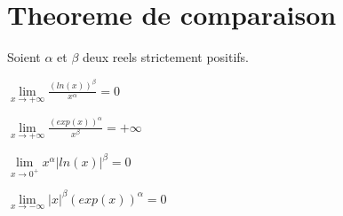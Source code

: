 \documentclass[12pt,twoside,a4paper]{article}
\begin{document}
	\section{Theoreme de comparaison}
		\begin{prop}
			Soient $\alpha$ et $\beta$ deux reels strictement positifs.
			\begin{liste}
				\item $\lim\limits_{x\rightarrow+\infty}\frac{\left(ln(x)\right)^\beta}{x^\alpha}=0$
				\item $\lim\limits_{x\rightarrow+\infty}\frac{\left(exp(x)\right)^\alpha}{x^\beta}=+\infty$
				\item $\lim\limits_{x\rightarrow0^+}x^\alpha\left|ln(x)\right|^\beta=0$
				\item $\lim\limits_{x\rightarrow-\infty}|x|^\beta \left(exp(x)\right)^\alpha=0$
			\end{liste}
		\end{prop}
\end{document}
